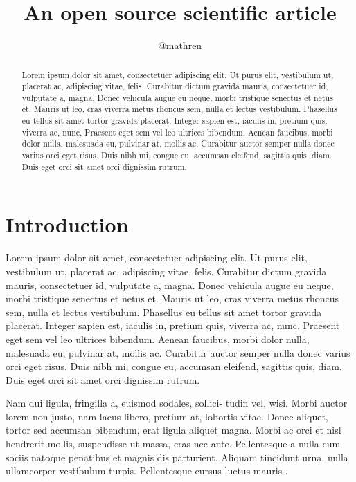 \documentclass[twocolumn]{aastex631}
\begin{document}
\title{An open source scientific article}

\author{@mathren}

\begin{abstract}
    Lorem ipsum dolor sit amet, consectetuer adipiscing elit. 
    Ut purus elit, vestibulum ut, placerat ac, adipiscing vitae, felis. 
    Curabitur dictum gravida mauris, consectetuer id, vulputate a, magna. 
    Donec vehicula augue eu neque, morbi tristique senectus et netus et. 
    Mauris ut leo, cras viverra metus rhoncus sem, nulla et lectus vestibulum. 
    Phasellus eu tellus sit amet tortor gravida placerat. 
    Integer sapien est, iaculis in, pretium quis, viverra ac, nunc. 
    Praesent eget sem vel leo ultrices bibendum. 
    Aenean faucibus, morbi dolor nulla, malesuada eu, pulvinar at, mollis ac. 
    Curabitur auctor semper nulla donec varius orci eget risus. 
    Duis nibh mi, congue eu, accumsan eleifend, sagittis quis, diam. 
    Duis eget orci sit amet orci dignissim rutrum.
\end{abstract}

\section{Introduction}
\label{sec:intro}

Lorem ipsum dolor sit amet, consectetuer adipiscing elit. 
Ut purus elit, vestibulum ut, placerat ac, adipiscing vitae, felis. 
Curabitur dictum gravida mauris, consectetuer id, vulputate a, magna. 
Donec vehicula augue eu neque, morbi tristique senectus et netus et. 
Mauris ut leo, cras viverra metus rhoncus sem, nulla et lectus vestibulum. 
Phasellus eu tellus sit amet tortor gravida placerat. 
Integer sapien est, iaculis in, pretium quis, viverra ac, nunc. 
Praesent eget sem vel leo ultrices bibendum. 
Aenean faucibus, morbi dolor nulla, malesuada eu, pulvinar at, mollis ac. 
Curabitur auctor semper nulla donec varius orci eget risus. 
Duis nibh mi, congue eu, accumsan eleifend, sagittis quis, diam. 
Duis eget orci sit amet orci dignissim rutrum.

Nam dui ligula, fringilla a, euismod sodales, sollici- tudin vel, wisi. 
Morbi auctor lorem non justo, nam lacus libero, pretium at, lobortis vitae. 
Donec aliquet, tortor sed accumsan bibendum, erat ligula aliquet magna. 
Morbi ac orci et nisl hendrerit mollis, suspendisse ut massa, cras nec ante. 
Pellentesque a nulla cum sociis natoque penatibus et magnis dis parturient. 
Aliquam tincidunt urna, nulla ullamcorper vestibulum turpis. 
Pellentesque cursus luctus mauris \citep{Luger2021}.


\end{document}
